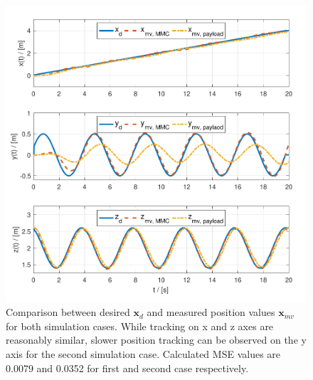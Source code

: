 \begin{figure}
	\centering
	\includegraphics[width=\columnwidth]{./pictures/traj_pos.pdf}
	\caption{Comparison between desired $\textbf{x}_d$ and measured position values $\textbf{x}_{mv}$ for both simulation cases. While tracking on x and z axes are reasonably similar, slower position tracking can be observed on the y axis for the second simulation case. Calculated MSE values are 0.0079 and 0.0352 for first and second case respectively.}
	\label{fig:traj_pos}
\end{figure}

